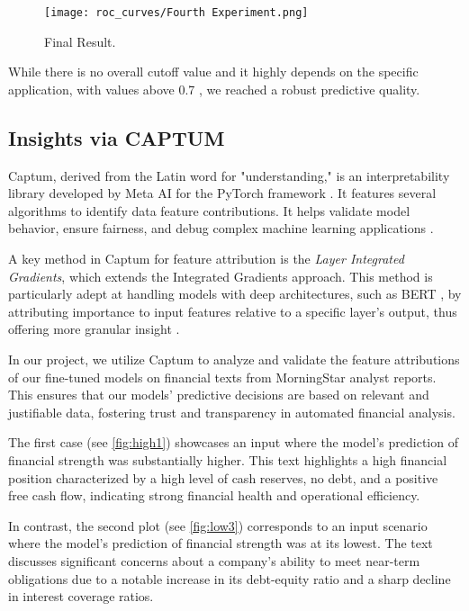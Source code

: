 \documentclass[conference]{IEEEtran}
\begin{document}
\begin{figure}[H]
    \centering
    \texttt{[image: roc\_curves/Fourth Experiment.png]}
    \caption[Fourth Experiment]{Final Result.}
    \label{fig:Fourthexp}
\end{figure}

While there is no overall cutoff value and it highly depends on the specific application, with values above 0.7 \cite{Hosmer2013}, we reached a robust predictive quality.

\subsection{Insights via CAPTUM}%
Captum, derived from the Latin word for "understanding," is an interpretability library developed by Meta AI for the PyTorch framework \cite{paszke2019pytorch}. It features several algorithms to identify data feature contributions. It helps validate model behavior, ensure fairness, and debug complex machine learning applications \cite{Kokhlikyan2020}.

A key method in Captum for feature attribution is the \textit{Layer Integrated Gradients}, which extends the Integrated Gradients \cite{sundararajan2017axiomatic} approach. This method is particularly adept at handling models with deep architectures, such as BERT \cite{devlin2019bert}, by attributing importance to input features relative to a specific layer's output, thus offering more granular insight \cite{sundararajan2017axiomatic}.

In our project, we utilize Captum to analyze and validate the feature attributions of our fine-tuned models on financial texts from MorningStar analyst reports. This ensures that our models' predictive decisions are based on relevant and justifiable data, fostering trust and transparency in automated financial analysis.

The first case (see \ref{fig:high1}) showcases an input where the model's prediction of financial strength was substantially higher. This text highlights a high financial position characterized by a high level of cash reserves, no debt, and a positive free cash flow, indicating strong financial health and operational efficiency.

In contrast, the second plot (see \ref{fig:low3}) corresponds to an input scenario where the model's prediction of financial strength was at its lowest. The text discusses significant concerns about a company's ability to meet near-term obligations due to a notable increase in its debt-equity ratio and a sharp decline in interest coverage ratios.
\end{document}
